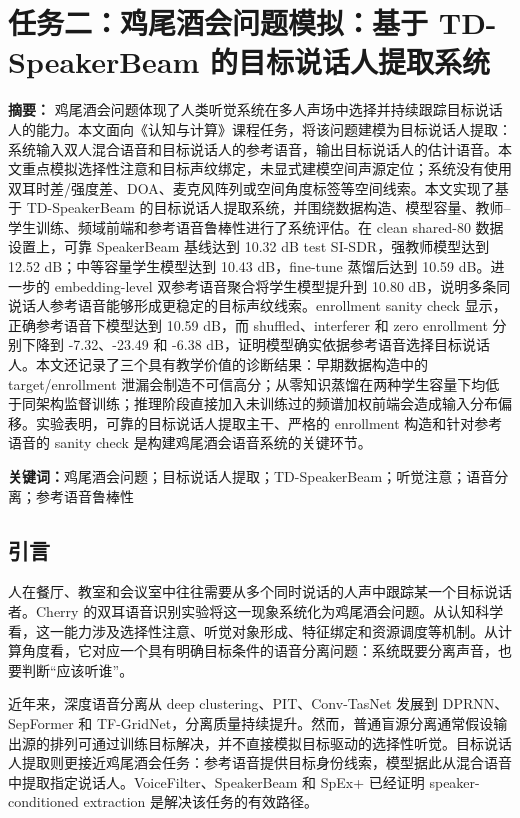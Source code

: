 \documentclass[UTF8,zihao=5,a4paper]{ctexart}
\newcommand{\sisdr}{SI-SDR}
\begin{document}
\section{任务二：鸡尾酒会问题模拟：基于 TD-SpeakerBeam 的目标说话人提取系统}

\noindent\textbf{摘要：}
鸡尾酒会问题体现了人类听觉系统在多人声场中选择并持续跟踪目标说话人的能力。本文面向《认知与计算》课程任务，将该问题建模为目标说话人提取：系统输入双人混合语音和目标说话人的参考语音，输出目标说话人的估计语音。本文重点模拟选择性注意和目标声纹绑定，未显式建模空间声源定位；系统没有使用双耳时差/强度差、DOA、麦克风阵列或空间角度标签等空间线索。本文实现了基于 TD-SpeakerBeam 的目标说话人提取系统，并围绕数据构造、模型容量、教师--学生训练、频域前端和参考语音鲁棒性进行了系统评估。在 clean shared-80 数据设置上，可靠 SpeakerBeam 基线达到 10.32 dB test \sisdr{}，强教师模型达到 12.52 dB；中等容量学生模型达到 10.43 dB，fine-tune 蒸馏后达到 10.59 dB。进一步的 embedding-level 双参考语音聚合将学生模型提升到 10.80 dB，说明多条同说话人参考语音能够形成更稳定的目标声纹线索。enrollment sanity check 显示，正确参考语音下模型达到 10.59 dB，而 shuffled、interferer 和 zero enrollment 分别下降到 -7.32、-23.49 和 -6.38 dB，证明模型确实依据参考语音选择目标说话人。本文还记录了三个具有教学价值的诊断结果：早期数据构造中的 target/enrollment 泄漏会制造不可信高分；从零知识蒸馏在两种学生容量下均低于同架构监督训练；推理阶段直接加入未训练过的频谱加权前端会造成输入分布偏移。实验表明，可靠的目标说话人提取主干、严格的 enrollment 构造和针对参考语音的 sanity check 是构建鸡尾酒会语音系统的关键环节。

\noindent\textbf{关键词：}鸡尾酒会问题；目标说话人提取；TD-SpeakerBeam；听觉注意；语音分离；参考语音鲁棒性

\subsection{引言}

人在餐厅、教室和会议室中往往需要从多个同时说话的人声中跟踪某一个目标说话者。Cherry 的双耳语音识别实验将这一现象系统化为鸡尾酒会问题\cite{cherry1953}。从认知科学看，这一能力涉及选择性注意、听觉对象形成、特征绑定和资源调度等机制\cite{broadbent1958,bregman1990}。从计算角度看，它对应一个具有明确目标条件的语音分离问题：系统既要分离声音，也要判断“应该听谁”。

近年来，深度语音分离从 deep clustering\cite{hershey2016deep}、PIT\cite{yu2017pit}、Conv-TasNet\cite{luo2019convtasnet} 发展到 DPRNN\cite{luo2020dprnn}、SepFormer\cite{subakan2021sepformer} 和 TF-GridNet\cite{wang2023tfgridnet}，分离质量持续提升。然而，普通盲源分离通常假设输出源的排列可通过训练目标解决，并不直接模拟目标驱动的选择性听觉。目标说话人提取则更接近鸡尾酒会任务：参考语音提供目标身份线索，模型据此从混合语音中提取指定说话人。VoiceFilter、SpeakerBeam 和 SpEx+ 已经证明 speaker-conditioned extraction 是解决该任务的有效路径\cite{wang2019voicefilter,zmolikova2019speakerbeam,ge2020spexplus}。
\end{document}
